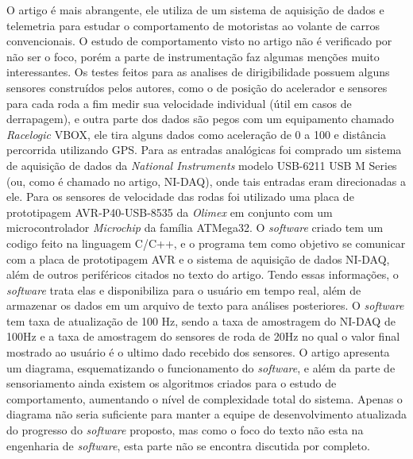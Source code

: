 O artigo \cite{racecarInstrumentationFor2012} é mais abrangente, ele utiliza de um sistema de aquisição de dados e telemetria para estudar o comportamento de motoristas ao volante de carros convencionais. O estudo de comportamento visto no artigo não é verificado por não ser o foco, porém a parte de instrumentação faz algumas menções muito interessantes. Os testes feitos para as analises de dirigibilidade possuem alguns sensores construídos pelos autores, como o de posição do acelerador e sensores para cada roda a fim medir sua velocidade individual (útil em casos de derrapagem), e outra parte dos dados são pegos com um equipamento chamado \textit{Racelogic} VBOX, ele tira alguns dados como aceleração de 0 a 100 e distância percorrida utilizando GPS. Para as entradas analógicas foi comprado um sistema de aquisição de dados da \textit{National Instruments} modelo USB-6211 USB M Series (ou, como é chamado no artigo, NI-DAQ), onde tais entradas eram direcionadas a ele. Para os sensores de velocidade das rodas foi utilizado uma placa de prototipagem AVR-P40-USB-8535 da \textit{Olimex} em conjunto com um microcontrolador \textit{Microchip} da família ATMega32. O \textit{software} criado tem um codigo feito na linguagem C/C++, e o programa tem como objetivo se comunicar com a placa de prototipagem AVR e o sistema de aquisição de dados NI-DAQ, além de outros periféricos citados no texto do artigo. Tendo essas informações, o \textit{software} trata elas e disponibiliza para o usuário em tempo real, além de armazenar os dados em um arquivo de texto para análises posteriores. O \textit{software} tem taxa de atualização de 100 Hz, sendo a taxa de amostragem do NI-DAQ de 100Hz e a taxa de amostragem do sensores de roda de 20Hz no qual o valor final mostrado ao usuário é o ultimo dado recebido dos sensores. O artigo apresenta um diagrama, esquematizando o funcionamento do \textit{software}, e além da parte de sensoriamento ainda existem os algoritmos criados para o estudo de comportamento, aumentando o nível de complexidade total do sistema. Apenas o diagrama não seria suficiente para manter a equipe de desenvolvimento atualizada do progresso do \textit{software} proposto, mas como o foco do texto não esta na engenharia de \textit{software}, esta parte não se encontra discutida por completo.



